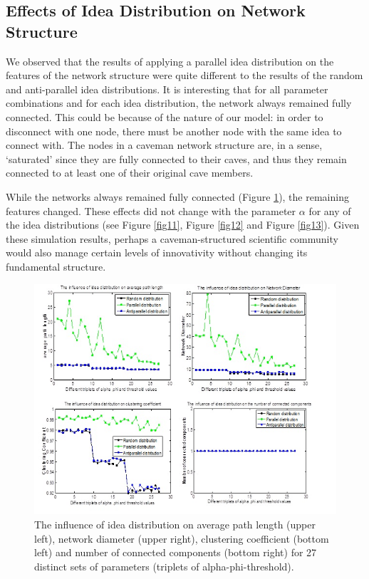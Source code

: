 \documentclass{beamer}
\begin{document}
%
\begin{frame}
\subsection{Effects of Idea Distribution on Network Structure}


We observed that the results of applying a parallel idea distribution on the features of the network structure were quite different to the results of the random and anti-parallel idea distributions. It is interesting that for all parameter combinations and for each idea distribution, the network always remained fully connected. This could be because of the nature of our model: in order to disconnect with one node, there must be another node with the same idea to connect with. The nodes in a caveman network structure are, in a sense, `saturated' since they are fully connected to their caves, and thus they remain connected to at least one of their original cave members. 

While the networks always remained fully connected (Figure \ref{fig9}), the remaining features changed. These effects did not change with the parameter $\alpha$ for any of the idea distributions (see Figure \ref{fig11}, Figure \ref{fig12} and Figure \ref{fig13}). Given these simulation results, perhaps a caveman-structured scientific community would also manage certain levels of innovativity without changing its fundamental structure.

\begin{figure}
[htp]
\begin{center}
\includegraphics{Fig9}
\end{center}
\caption{The influence of idea distribution on average path length (upper left), network diameter (upper right), clustering coefficient (bottom left) and number of connected components (bottom right) for 27 distinct sets of parameters (triplets of alpha-phi-threshold). }
\label {fig9}
\end{figure}


\end{frame}
\end{document}
